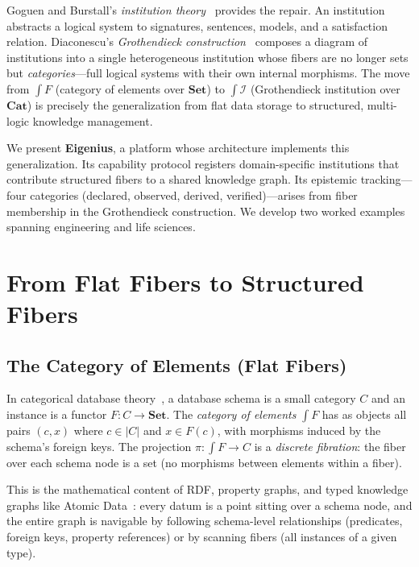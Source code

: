 \documentclass[10pt,twocolumn,letterpaper]{article}
\newcommand{\Cat}{\mathbf{Cat}}
\newcommand{\Set}{\mathbf{Set}}
\begin{document}
Goguen and Burstall's \emph{institution theory}~\cite{goguen1992} provides the repair.
An institution abstracts a logical system to signatures, sentences, models, and a satisfaction relation.
Diaconescu's \emph{Grothendieck construction}~\cite{diaconescu2002,diaconescu2008} composes a diagram of institutions into a single heterogeneous institution whose fibers are no longer sets but \emph{categories}---full logical systems with their own internal morphisms.
The move from $\int F$ (category of elements over $\Set$) to $\int \mathcal{I}$ (Grothendieck institution over $\Cat$) is precisely the generalization from flat data storage to structured, multi-logic knowledge management.

We present \textbf{Eigenius}, a platform whose architecture implements this generalization.
Its capability protocol registers domain-specific institutions that contribute structured fibers to a shared knowledge graph.
Its epistemic tracking---four categories (declared, observed, derived, verified)---arises from fiber membership in the Grothendieck construction.
We develop two worked examples spanning engineering and life sciences.


\section{From Flat Fibers to Structured Fibers}
\label{sec:fibers}

\subsection{The Category of Elements (Flat Fibers)}

In categorical database theory~\cite{spivak2012}, a database schema is a small category $C$ and an instance is a functor $F: C \to \Set$.
The \emph{category of elements} $\int F$ has as objects all pairs $(c, x)$ where $c \in |C|$ and $x \in F(c)$, with morphisms induced by the schema's foreign keys.
The projection $\pi: \int F \to C$ is a \emph{discrete fibration}: the fiber over each schema node is a set (no morphisms between elements within a fiber).

This is the mathematical content of RDF, property graphs, and typed knowledge graphs like Atomic Data~\cite{atomicdata}: every datum is a point sitting over a schema node, and the entire graph is navigable by following schema-level relationships (predicates, foreign keys, property references) or by scanning fibers (all instances of a given type).
\end{document}

